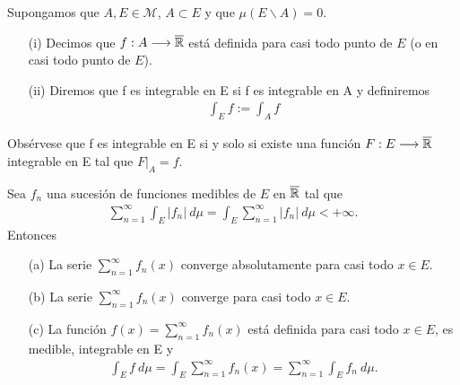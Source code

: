 \begin{defi}
Supongamos que $A, E \in \mathcal{M}$, $A \subset E$ y que $\mu(E \backslash A) = 0$. 
\begin{enumerate}
    \item[(i)] Decimos que $f: A \longrightarrow \overline{\mathbb{R}}$ está definida para casi todo punto de $E$ (o en casi todo punto de $E$).
    \item[(ii)]  Diremos que f es integrable en E si f es integrable en A y definiremos
    \begin{align*}
        \int_{E}{f} := \int_{A}{f}
    \end{align*}
\end{enumerate}
Obsérvese que f es integrable en E si y solo si existe una función $F: E \longrightarrow \overline{\mathbb{R}}$ integrable en E tal que $F|_A = f$.
\end{defi}

\begin{cor}
Sea $f_n$ una sucesión de funciones medibles de $E$ en $\overline{\mathbb{R}}$ tal que
\begin{align*}
    \sum_{n=1}^{\infty}{\int_{E}{|f_n| \ d\mu}} = \int_{E}{\sum_{n=1}^{\infty}{|f_n|} \ d\mu} < +\infty.
\end{align*}
Entonces
\begin{enumerate}
    \item[(a)] La serie $\sum_{n=1}^{\infty}{f_n(x)}$ converge absolutamente para casi todo $x \in E$.
    \item[(b)] La serie $\sum_{n=1}^{\infty}{f_n(x)}$ converge para casi todo $x \in E$.
    \item[(c)] La función $f(x) = \sum_{n=1}^{\infty}{f_n(x)}$ está definida para casi todo $x \in E$, es medible, integrable en E y
    \begin{align*}
        \int_{E}{f \ d\mu} = \int_{E}{\sum_{n=1}^{\infty}{f_n(x)}} = \sum_{n=1}^{\infty}{\int_{E}{f_n \ d\mu}}.
    \end{align*}
\end{enumerate}
\end{cor}

